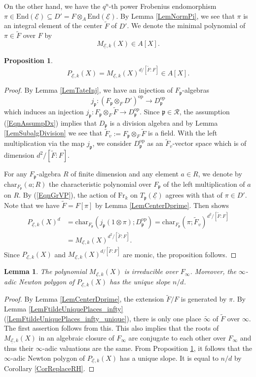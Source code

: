\documentclass[10pt]{amsart}
\theoremstyle{plain}
\newtheorem{prop}[thm]{Proposition}
\newtheorem{lem}[thm]{Lemma}
\theoremstyle{definition}
\newcommand{\chr}{\mathrm{char}}
\newcommand{\End}{\mathrm{End}}
\newcommand{\Fr}{\mathrm{Fr}}
\newcommand{\opp}{\mathrm{op}}
\newcommand{\cR}{\mathcal{R}}
\newcommand{\ucE}{\underline{\mathcal{E}}}
\newcommand{\frp}{\mathfrak{p}}
\begin{document}
On the other hand, we have the $q^n$-th power Frobenius endomorphism $\pi\in \End(\ucE)\subseteq D'=F\otimes_A \End(\ucE)$.
By Lemma \ref{LemNormPi}, we see that $\pi$ is an integral element of the center $\tilde{F}$ of $D'$.
We denote the minimal polynomial of $\pi\in \tilde{F}$ over $F$ by
\[
M_{\ucE,k}(X)\in A[X].
\]

\begin{prop}\label{PropRedCharPolyMinPoly}
	\[
	P_{\ucE,k}(X)=M_{\ucE,k}(X)^{d/[\tilde{F}:F]}\in A[X].
	\]
\end{prop}
\begin{proof}
	By Lemma \ref{LemTateInj}, we have an injection of $F_\frp$-algebras
	\[
	j_\frp: (F_\frp\otimes_F D')^\opp\to D_\frp^\opp
	\]
	which induces an injection $j_\frp:F_\frp\otimes_F \tilde{F}\to D_\frp^\opp$.
	Since $\frp\in \cR$, the assumption (\ref{EqnAssumpDx}) implies that 
	$D_\frp$ is a division algebra and by Lemma \ref{LemSubalgDivision} 
	we see that 
	$\tilde{F}_v:=F_\frp\otimes_F \tilde{F}$ is a field.
	With the left multiplication via the map $j_\frp$,
	we consider $D_\frp^\opp$ as an $\tilde{F}_v$-vector space
	which is of dimension $d^2/[\tilde{F}:F]$.
	
	
	For any $F_\frp$-algebra $R$ of finite dimension and any element $a\in R$, we denote by
	$\chr_{F_\frp}(a;R)$ the characteristic polynomial over $F_\frp$ of the 
	left multiplication of $a$ on $R$.
	By (\ref{EqnGrVP}), the action of $\Fr_k$ 
	on $T_\frp(\ucE)$ agrees 
	with that of $\pi\in D'$. 
	Note that we have $\tilde{F}=F[\pi]$ by Lemma \ref{LemCenterDprime}.
	Then \cite[Theorem 9.5]{Rei} shows
	\[
	\begin{aligned}
		P_{\ucE,k}(X)^d&=\chr_{F_\frp}(j_\frp(1\otimes \pi);D_\frp^\opp)
		=\chr_{F_\frp}(\pi;\tilde{F}_v)^{d^2/[\tilde{F}:F]}\\
		&=M_{\ucE,k}(X)^{d^2/[\tilde{F}:F]}.
	\end{aligned}
	\]
	Since $P_{\ucE,k}(X)$ and $M_{\ucE,k}(X)^{d/[\tilde{F}:F]}$ are monic, the 
	proposition follows. 
\end{proof}

\begin{lem}\label{LemNPInfty}
	The polynomial $M_{\ucE,k}(X)$ is irreducible over $F_\infty$. 
	Moreover, the $\infty$-adic Newton polygon of $P_{\ucE,k}(X)$ has the unique slope $n/d$.
\end{lem}
\begin{proof}
	By Lemma \ref{LemCenterDprime}, the extension $\tilde{F}/F$ is generated by $\pi$. 
	By Lemma \ref{LemFtildeUniquePlaces_infty} (\ref{LemFtildeUniquePlaces_infty_unique}), there is only one place $\tilde{\infty}$ of $\tilde{F}$
	over $\infty$. The first assertion follows from this.
	This also implies that the roots of $M_{\ucE,k}(X)$ in an algebraic closure of $F_\infty$ are conjugate to each other over $F_\infty$
	and thus their $\infty$-adic valuations are the same. 
	From Proposition \ref{PropRedCharPolyMinPoly}, it follows that the $\infty$-adic Newton polygon of $P_{\ucE,k}(X)$ has a unique slope.
	It is equal to $n/d$ by Corollary \ref{CorReplaceRH}.
\end{proof}
\end{document}
